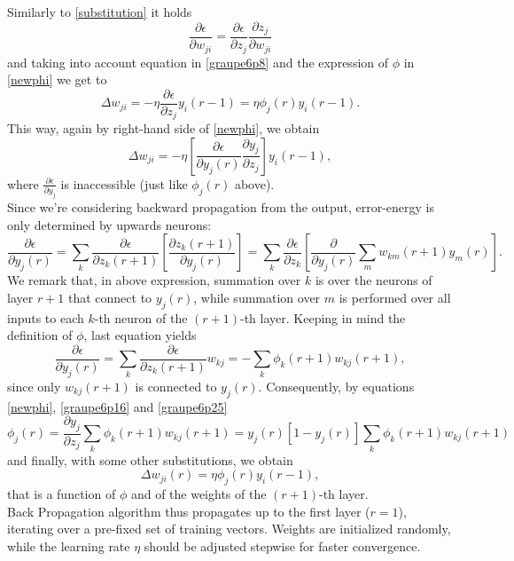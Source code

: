 \documentclass[%
    corpo=11pt,
    twoside,
    stile=classica,
    oldstyle,
    autoretitolo,
    tipotesi=magistrale,
    greek,
    evenboxes,
    english
]{toptesi}
\begin{document}
Similarly to \eqref{substitution} it holds
\begin{equation}
\frac{\partial \epsilon}{\partial w_{ji}} = \frac{\partial \epsilon}{\partial z_j} \frac{\partial z_j}{\partial w_{ji}}
\end{equation}
and taking into account equation in \eqref{graupe6p8} and the expression of $\phi$ in \eqref{newphi} we get to
\begin{equation}
\Delta w_{ji} = -\eta \frac{\partial \epsilon}{\partial z_j} y_i (r-1) = \eta \phi_j(r)y_i(r-1).
\end{equation}
This way, again by right-hand side of \eqref{newphi}, we obtain
\begin{equation}
\Delta w_{ji} = -\eta \left[ \frac{\partial \epsilon}{\partial y_j (r)} \frac{\partial y_j}{\partial z_j} \right]y_i(r-1),
\end{equation}
where $\frac{\partial \epsilon}{\partial y_j}$ is inaccessible (just like $\phi_j (r)$ above). \\
Since we're considering backward propagation from the output, error-energy is only determined by upwards neurons:
\begin{equation}
\frac{\partial \epsilon}{\partial y_j (r)} = \sum_k \frac{\partial \epsilon}{\partial z_k (r+1)} \left[\frac{\partial z_k (r+1)}{\partial y_j (r)} \right] = \sum_k \frac{\partial \epsilon}{\partial z_k} \left[ \frac{\partial}{\partial y_j(r)} \sum_m w_{km}(r+1)y_m(r)\right].
\end{equation}
We remark that, in above expression, summation over $k$ is over the neurons of layer $r+1$ that connect to $y_j(r)$, while summation over $m$ is performed over all inputs to each $k$-th neuron of the $(r+1)$-th layer. Keeping in mind the definition of $\phi$, last equation yields
\begin{equation} 
\label{graupe6p25}
\frac{\partial \epsilon}{\partial y_j (r)}  = \sum_k \frac{\partial \epsilon}{\partial z_k (r+1)}w_{kj} = - \sum_k \phi_k(r+1)w_{kj}(r+1),
\end{equation}
since only $w_{kj}(r+1)$ is connected to $y_j(r)$. Consequently, by equations \eqref{newphi}, \eqref{graupe6p16} and \eqref{graupe6p25}
\begin{equation}
\phi_j(r) = \frac{\partial y_j}{\partial z_j}\sum_k \phi_k(r+1)w_{kj}(r +1) = y_j(r)\left[1 -y_j(r)\right]\sum_k \phi_k(r+1)w_{kj}(r +1)
\end{equation}
and finally, with some other substitutions, we obtain
\begin{equation}
\Delta w_{ji}(r) = \eta \phi_j(r)y_i(r-1),
\end{equation}
that is a function of $\phi$ and of the weights of the $(r + 1)$-th layer. \\
Back Propagation algorithm thus propagates up to the first layer ($r = 1$), iterating over a pre-fixed set of training vectors. Weights are initialized randomly, while the learning rate $\eta$ should be adjusted stepwise for faster convergence.
\end{document}

